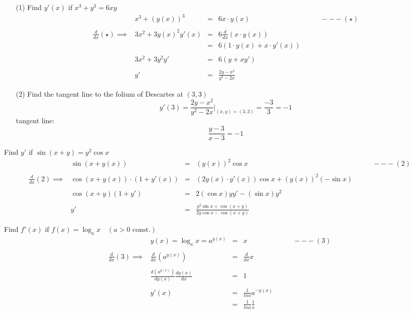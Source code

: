 \begin{eg}
\begin{itemize}
\item[(1)] Find $y'(x)$ if $x^3+y^3=6xy$\\
$$\begin{array}{rrcll}
& x^3 + (y(x))^3 & = & 6x\cdot y(x) & \quad \quad ---(\star)\\\\
\displaystyle \frac{d}{dx}(\star) \implies & 3x^2 +3y(x)^2y'(x) & = & \displaystyle 6\frac{d}{dx} (x \cdot y(x))\\
&& = & 6(1 \cdot y(x) + x \cdot y'(x))\\\\
& 3x^2 +3y^2y' & = & 6(y+xy')\\\\
& y' & = & \displaystyle \frac{2y-x^2}{y^2-2x}
\end{array}$$
\item[(2)] Find the tangent line to the folium of Descartes at $(3, 3)$
$$\displaystyle y'(3) = \frac{2y-x^2}{y^2-2x} \Big|_{(x,y)=(3,3)} = \frac{-3}{3} = -1$$
tangent line:
$$\displaystyle \frac{y-3}{x-3} = -1$$
\end{itemize}
\end{eg}
\begin{eg}
Find $y'$ if $\sin(x+y) = y^2 \cos x$\\
$$\begin{array}{rrcll}
& \sin (x+y(x)) & = & (y(x))^2 \cos x & \quad \quad ---(2)\\\\
\displaystyle \frac{d}{dx}(2) \implies & \cos(x+y(x)) \cdot (1+y'(x)) & = & (2 y(x) \cdot  y'(x)) \cos x + (y(x))^2(-\sin x)\\\\
& \cos (x+y) (1+y') & = & 2(\cos x)yy' - (\sin x)y^2\\\\
& y' & = & \displaystyle \frac{y^2 \sin x + \cos (x+y)}{2y \cos x -\cos (x+y)}
\end{array}$$
\end{eg}
\begin{eg}
Find $f'(x)$ if $f(x) = \log_a x \quad (a>0 \text{ const.})$
$$\begin{array}{rrcll}
& y(x) = \log_a x = a^{y(x)} & = & x & \quad \quad ---(3)\\\\
\displaystyle \frac{d}{dx} (3) \implies & \displaystyle \frac{d}{dx} (a^{y(x)}) & = & \displaystyle \frac{d}{dx} x\\\\
& \displaystyle \frac{d(a^{y(x)})}{dy(x)} \frac{dy(x)}{dx} & = & 1\\\\
& y'(x) & = & \displaystyle \frac{1}{ln a} a^{-y(x)}\\
&& = & \displaystyle \frac{1}{ln a} \frac{1}{x}
\end{array}$$
\end{eg}
